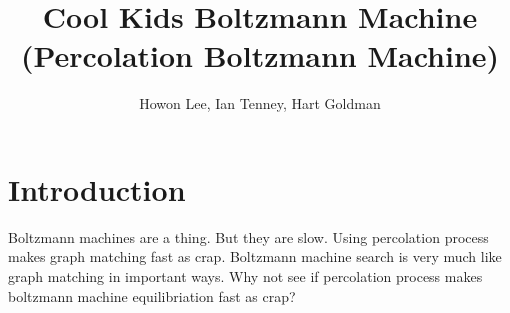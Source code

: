 \documentclass[12pt]{article}
\begin{document}
\title{Cool Kids Boltzmann Machine (Percolation Boltzmann Machine)}
\author{Howon Lee, Ian Tenney, Hart Goldman}
\maketitle

\section{Introduction}
Boltzmann machines are a thing. But they are slow. Using percolation process makes graph matching fast as crap. Boltzmann machine search is very much like graph matching in important ways. Why not see if percolation process makes boltzmann machine equilibriation fast as crap?
\end{document}
